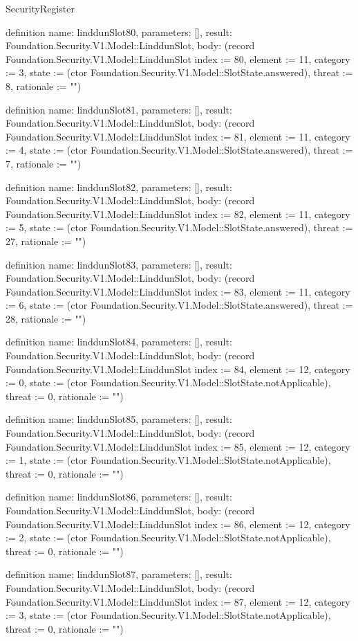 \begin{lexlean}{SecurityRegister}
\begin{semanticmodule}
definition{
  name: linddunSlot80,
  parameters: [],
  result: Foundation.Security.V1.Model::LinddunSlot,
  body: (record Foundation.Security.V1.Model::LinddunSlot {index := 80, element := 11, category := 3, state := (ctor Foundation.Security.V1.Model::SlotState.answered), threat := 8, rationale := ""})
}

definition{
  name: linddunSlot81,
  parameters: [],
  result: Foundation.Security.V1.Model::LinddunSlot,
  body: (record Foundation.Security.V1.Model::LinddunSlot {index := 81, element := 11, category := 4, state := (ctor Foundation.Security.V1.Model::SlotState.answered), threat := 7, rationale := ""})
}

definition{
  name: linddunSlot82,
  parameters: [],
  result: Foundation.Security.V1.Model::LinddunSlot,
  body: (record Foundation.Security.V1.Model::LinddunSlot {index := 82, element := 11, category := 5, state := (ctor Foundation.Security.V1.Model::SlotState.answered), threat := 27, rationale := ""})
}

definition{
  name: linddunSlot83,
  parameters: [],
  result: Foundation.Security.V1.Model::LinddunSlot,
  body: (record Foundation.Security.V1.Model::LinddunSlot {index := 83, element := 11, category := 6, state := (ctor Foundation.Security.V1.Model::SlotState.answered), threat := 28, rationale := ""})
}

definition{
  name: linddunSlot84,
  parameters: [],
  result: Foundation.Security.V1.Model::LinddunSlot,
  body: (record Foundation.Security.V1.Model::LinddunSlot {index := 84, element := 12, category := 0, state := (ctor Foundation.Security.V1.Model::SlotState.notApplicable), threat := 0, rationale := ""})
}

definition{
  name: linddunSlot85,
  parameters: [],
  result: Foundation.Security.V1.Model::LinddunSlot,
  body: (record Foundation.Security.V1.Model::LinddunSlot {index := 85, element := 12, category := 1, state := (ctor Foundation.Security.V1.Model::SlotState.notApplicable), threat := 0, rationale := ""})
}

definition{
  name: linddunSlot86,
  parameters: [],
  result: Foundation.Security.V1.Model::LinddunSlot,
  body: (record Foundation.Security.V1.Model::LinddunSlot {index := 86, element := 12, category := 2, state := (ctor Foundation.Security.V1.Model::SlotState.notApplicable), threat := 0, rationale := ""})
}

definition{
  name: linddunSlot87,
  parameters: [],
  result: Foundation.Security.V1.Model::LinddunSlot,
  body: (record Foundation.Security.V1.Model::LinddunSlot {index := 87, element := 12, category := 3, state := (ctor Foundation.Security.V1.Model::SlotState.notApplicable), threat := 0, rationale := ""})
}


\end{semanticmodule}
\end{lexlean}
